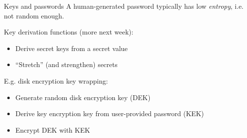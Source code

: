 \begin{frame}{Keys and passwords}
  \pause
  A human-generated password typically has low \emph{entropy}, i.e. not random enough.

  \pause
  Key derivation functions (more next week):
  \begin{itemize}[<+(1)->]
    \item Derive secret keys from a secret value
    \item \enquote{Stretch} (and strengthen) secrets
  \end{itemize}

  \vspace*{1em}

  \pause
  E.g. disk encryption key wrapping:
  \begin{itemize}[<+(1)->]
    \item Generate random disk encryption key (DEK)
    \item Derive key encryption key from user-provided password (KEK)
    \item Encrypt DEK with KEK
  \end{itemize}
\end{frame}



